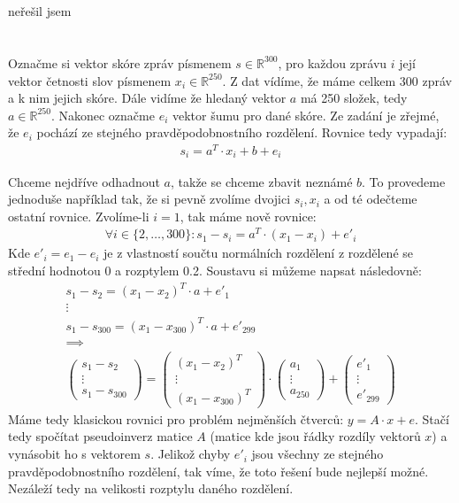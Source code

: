 \documentclass[12pt, a4paper]{article}
\begin{document}
\section{}
neřešil jsem

\section{}
Označme si vektor skóre zpráv písmenem $s \in \mathbb{R}^{300}$, pro každou zprávu $i$ její vektor četnosti slov písmenem $x_i \in \mathbb{R}^{250}$. Z dat vídíme, že máme celkem 300 zpráv a k nim jejich skóre. Dále vidíme že hledaný vektor $a$ má 250 složek, tedy $a \in \mathbb{R}^{250}$. Nakonec označme $e_i$ vektor šumu pro dané skóre. Ze zadání je zřejmé, že $e_i$ pochází ze stejného pravděpodobnostního rozdělení. Rovnice tedy vypadají:
\begin{gather}
\label{eq:1}
s_i = a^T \cdot x_i + b + e_i
\end{gather}

Chceme nejdříve odhadnout $a$, takže se chceme zbavit neznámé $b$. To provedeme jednoduše například tak, že si pevně zvolíme dvojici $s_i, x_i$ a od té odečteme ostatní rovnice. Zvolíme-li $i=1$, tak máme nově rovnice:
\begin{gather*}
\forall i \in \{2,\dots, 300\}: s_1-s_i = a^T \cdot (x_1-x_i) + e'_i
\end{gather*}
Kde $e'_i = e_1-e_i$ je z vlastností součtu normálních rozdělení z rozdělené se střední hodnotou 0 a rozptylem 0.2. Soustavu si můžeme napsat následovně:
\begin{gather*}
s_1 - s_2 = (x_1-x_2)^T \cdot a + e'_1\\
\vdots\\
s_1 - s_{300} = (x_1-x_{300})^T \cdot a + e'_{299}\\
\implies\\
\begin{pmatrix}
s_1-s_2 \\
\vdots \\
s_1-s_{300} 
\end{pmatrix} = 
\begin{pmatrix}
(x_1-x_2)^T \\
\vdots \\
(x_1-x_{300})^T 
\end{pmatrix} \cdot
\begin{pmatrix}
a_1 \\
\vdots \\
a_{250} 
\end{pmatrix} + 
\begin{pmatrix}
e'_1 \\
\vdots \\
e'_{299} 
\end{pmatrix}
\end{gather*} 
Máme tedy klasickou rovnici pro problém nejměnších čtverců: $y=A\cdot x+ e$. Stačí tedy spočítat pseudoinverz matice $A$ (matice kde jsou řádky rozdíly vektorů $x$) a vynásobit ho s vektorem $s$. Jelikož chyby $e'_i$ jsou všechny ze stejného pravděpodobnostního rozdělení, tak víme, že toto řešení bude nejlepší možné. Nezáleží tedy na velikosti rozptylu daného rozdělení.
\end{document}

